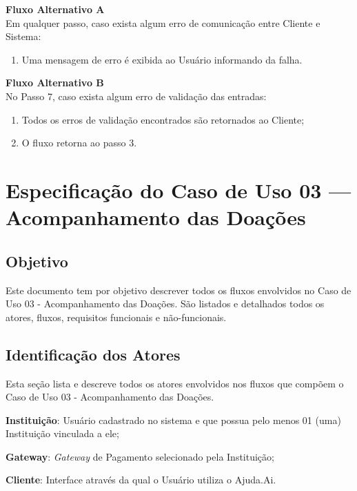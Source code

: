 \begin{lista}
    \textbf{Fluxo Alternativo A} \\
    Em qualquer passo, caso exista algum erro de comunicação entre Cliente e Sistema:
    \begin{enumerate}
    \item Uma mensagem de erro é exibida ao Usuário informando da falha.
    \end{enumerate}
    
    \textbf{Fluxo Alternativo B} \\
    No Passo 7, caso exista algum erro de validação das entradas:
    \begin{enumerate}
    \item Todos os erros de validação encontrados são retornados ao Cliente;
    \item O fluxo retorna ao passo 3.
    \end{enumerate}
\end{lista}
\pagebreak

\section*{Especificação do Caso de Uso 03 --- Acompanhamento das Doações}
\subsection*{Objetivo}
Este documento tem por objetivo descrever todos os fluxos envolvidos no Caso de Uso 03 - Acompanhamento das Doações. São listados e detalhados todos os atores, fluxos, requisitos funcionais e não-funcionais.

\subsection*{Identificação dos Atores}
Esta seção lista e descreve todos os atores envolvidos nos fluxos que compõem o Caso de Uso 03 - Acompanhamento das Doações.
\begin{lista}
  \item \textbf{Instituição}: Usuário cadastrado no sistema e que possua pelo menos 01 (uma) Instituição vinculada a ele;
  \item \textbf{Gateway}: \emph{Gateway} de Pagamento selecionado pela Instituição;
  \item \textbf{Cliente}: Interface através da qual o Usuário utiliza o Ajuda.Ai.
\end{lista}

